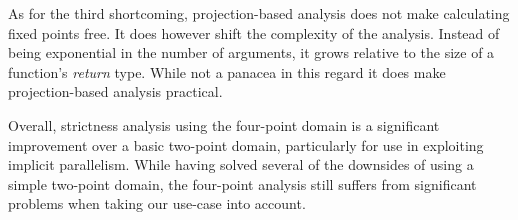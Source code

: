 As for the third shortcoming, projection-based analysis does not make
calculating fixed points free. It does however shift the complexity of the
analysis. Instead of being exponential in the number of arguments, it grows
relative to the size of a function's \emph{return} type. While not a panacea in
this regard it does make projection-based analysis practical.

Overall, strictness analysis using the four-point domain is a significant
improvement over a basic two-point domain, particularly for use in exploiting
implicit parallelism. While having solved several of the downsides of using
a simple two-point domain, the four-point analysis still suffers from
significant problems when taking our use-case into account.
